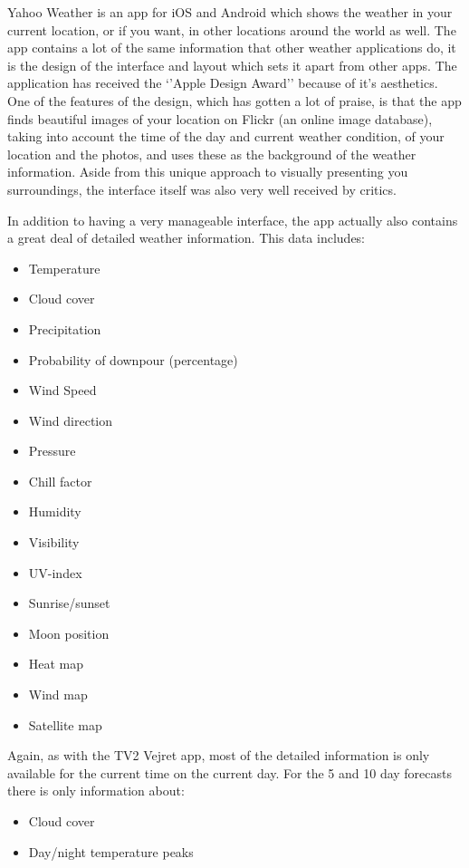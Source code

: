 Yahoo Weather is an app for iOS and Android which shows the weather in your current location, or if you want, in other locations around the world as well. 
The app contains a lot of the same information that other weather applications do, it is the design of the interface and layout which sets it apart from other apps. 
The application has received the \enquote*{'Apple Design Award'} because of it's aesthetics. 
One of the features of the design, which has gotten a lot of praise, is that the app finds beautiful images of your location on Flickr (an online image database), taking into account the time of the day and current weather condition, of your location and the photos, and uses these as the background of the weather information. 
Aside from this unique approach to visually presenting you surroundings, the interface itself was also very well received by critics. 


In addition to having a very manageable interface, the app actually also contains a great deal of detailed weather information. This data includes:

\begin{itemize}
    \item Temperature
    \item Cloud cover
    \item Precipitation
    \item Probability of downpour (percentage)
    \item Wind Speed
    \item Wind direction
    \item Pressure
    \item Chill factor
    \item Humidity
    \item Visibility
    \item UV-index
    \item Sunrise/sunset
    \item Moon position
    \item Heat map
    \item Wind map
    \item Satellite map
\end{itemize}

Again, as with the TV2 Vejret app, most of the detailed information is only available for the current time on the current day. 
For the 5 and 10 day forecasts there is only information about:

\begin{itemize}
    \item Cloud cover
    \item Day/night temperature peaks
\end{itemize}

